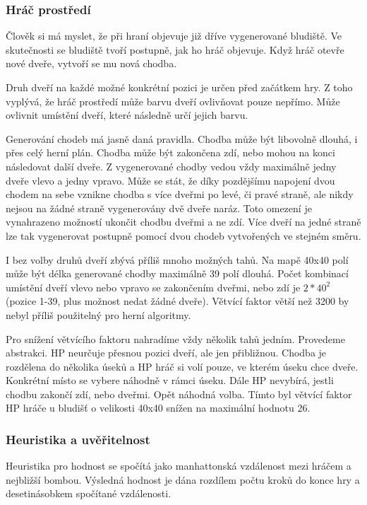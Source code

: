 \subsubsection{Hráč prostředí}

Člověk si má myslet, že při hraní objevuje již dříve vygenerované bludiště. Ve skutečnosti se bludiště tvoří postupně, jak ho hráč objevuje. Když hráč otevře nové dveře, vytvoří se mu nová chodba. 

Druh dveří na každé možné konkrétní pozici je určen před začátkem hry. Z toho vyplývá, že hráč prostředí může barvu dveří ovlivňovat pouze nepřímo. Může ovlivnit umístění dveří, které následně určí jejich barvu.

Generování chodeb má jasně daná pravidla. Chodba může být libovolně dlouhá, i přes celý herní plán. Chodba může být zakončena zdí, nebo mohou na konci následovat další dveře. Z vygenerované chodby vedou vždy maximálně jedny dveře vlevo a jedny vpravo. Může se stát, že díky pozdějšímu napojení dvou chodem na sebe vznikne chodba s více dveřmi po levé, či pravé straně, ale nikdy nejsou na žádné straně vygenerovány dvě dveře naráz. Toto omezení je vynahrazeno možností ukončit chodbu dveřmi a ne zdí. Více dveří na jedné straně lze tak vygenerovat postupně pomocí dvou chodeb vytvořených ve stejném směru.

I bez volby druhů dveří zbývá příliš mnoho možných tahů. Na mapě 40x40 polí může být délka generované chodby maximálně 39 polí dlouhá. Počet kombinací umístění dveří vlevo nebo vpravo se zakončením dveřmi, nebo zdí je $2*40^2$ (pozice 1-39, plus možnost nedat žádné dveře). Větvící faktor větší než 3200 by nebyl příliš použitelný pro herní algoritmy. 

Pro snížení větvícího faktoru nahradíme vždy několik tahů jedním. Provedeme abstrakci. HP neurčuje přesnou pozici dveří, ale jen přibližnou. Chodba je rozdělena do několika úseků a HP hráč si volí pouze, ve kterém úseku chce dveře. Konkrétní místo se vybere náhodně v rámci úseku. Dále HP nevybírá, jestli chodbu zakončí zdí, nebo dveřmi. Opět náhodná volba. Tímto byl větvící faktor HP hráče u bludišť o velikosti 40x40 snížen na maximální hodnotu 26.

\subsubsection{Heuristika a uvěřitelnost}

Heuristika pro hodnost se spočítá jako manhattonská vzdálenost mezi hráčem a nejbližší bombou. Výsledná hodnost je dána rozdílem počtu kroků do konce hry a desetinásobkem spočítané vzdálenosti.

